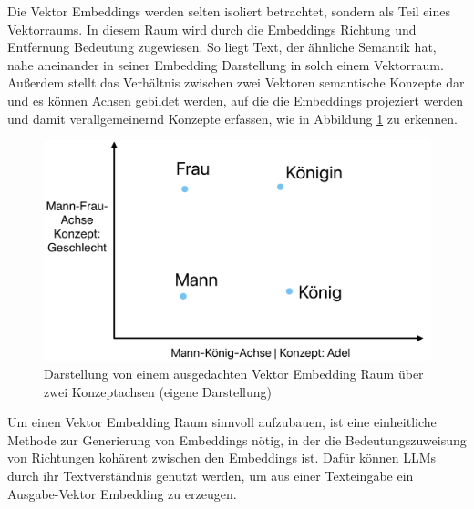 \documentclass[../main.tex]{subfiles}
\begin{document}
Die Vektor Embeddings werden selten isoliert betrachtet, sondern als Teil eines Vektorraums.
In diesem Raum wird durch die Embeddings Richtung und Entfernung Bedeutung zugewiesen.
So liegt Text, der ähnliche Semantik hat, nahe aneinander in seiner Embedding Darstellung in solch einem Vektorraum.
Außerdem stellt das Verhältnis zwischen zwei Vektoren semantische Konzepte dar und es können Achsen gebildet werden, auf die die Embeddings projeziert werden und damit verallgemeinernd Konzepte erfassen, wie in Abbildung \ref{fig:embeddingspace} zu erkennen.
\cite{heimerl2018interactive,mikolov2013efficient}

\begin{figure}[ht]
    \centering
    \includegraphics[scale=.23]{"bilder/embeddingspace.png"}
    \caption{Darstellung von einem ausgedachten Vektor Embedding Raum über zwei Konzeptachsen (eigene Darstellung)}
    \label{fig:embeddingspace}
\end{figure}

Um einen Vektor Embedding Raum sinnvoll aufzubauen, ist eine einheitliche Methode zur Generierung von Embeddings nötig, in der die Bedeutungszuweisung von Richtungen kohärent zwischen den Embeddings ist.
Dafür können \glspl{LLM} durch ihr Textverständnis genutzt werden, um aus einer Texteingabe ein Ausgabe-Vektor Embedding zu erzeugen.
\cite{zhang2023language}
\end{document}

